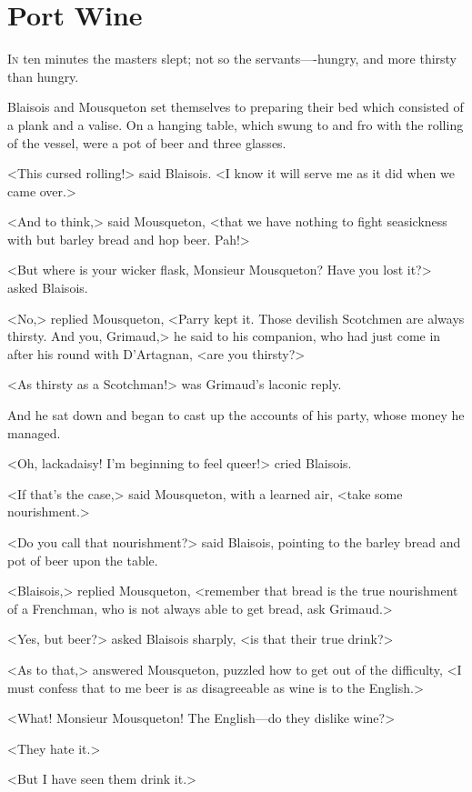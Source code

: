 \chapter{Port Wine}

 \lettrine{I}{n} ten minutes the masters slept; not so the servants—-hungry, and more thirsty than hungry.

\zz
Blaisois and Mousqueton set themselves to preparing their bed which consisted of a plank and a valise. On a hanging table, which swung to and fro with the rolling of the vessel, were a pot of beer and three glasses.

<This cursed rolling!> said Blaisois. <I know it will serve me as it did when we came over.>

<And to think,> said Mousqueton, <that we have nothing to fight seasickness with but barley bread and hop beer. Pah!>

<But where is your wicker flask, Monsieur Mousqueton? Have you lost it?> asked Blaisois.

<No,> replied Mousqueton, <Parry kept it. Those devilish Scotchmen are always thirsty. And you, Grimaud,> he said to his companion, who had just come in after his round with D'Artagnan, <are you thirsty?>

<As thirsty as a Scotchman!> was Grimaud's laconic reply.

And he sat down and began to cast up the accounts of his party, whose money he managed.

<Oh, lackadaisy! I'm beginning to feel queer!> cried Blaisois.

<If that's the case,> said Mousqueton, with a learned air, <take some nourishment.>

<Do you call that nourishment?> said Blaisois, pointing to the barley bread and pot of beer upon the table.

<Blaisois,> replied Mousqueton, <remember that bread is the true nourishment of a Frenchman, who is not always able to get bread, ask Grimaud.>

<Yes, but beer?> asked Blaisois sharply, <is that their true drink?>

<As to that,> answered Mousqueton, puzzled how to get out of the difficulty, <I must confess that to me beer is as disagreeable as wine is to the English.>

<What! Monsieur Mousqueton! The English—do they dislike wine?>

<They hate it.>

<But I have seen them drink it.>

